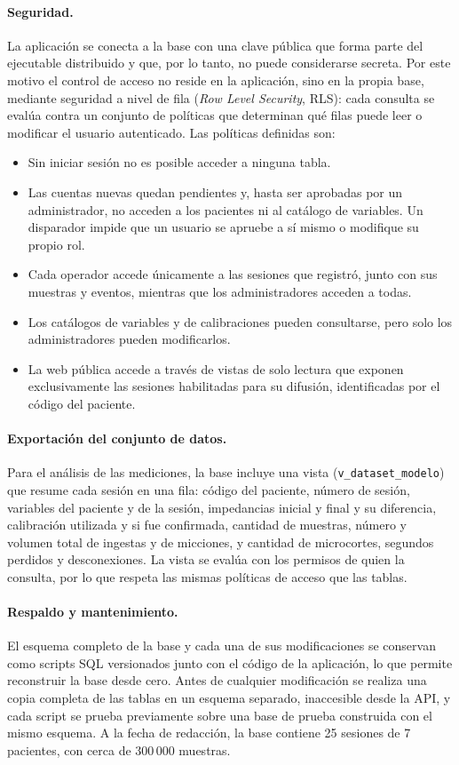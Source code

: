 \paragraph{Seguridad.} La aplicación se conecta a la base con una clave pública que forma parte del ejecutable distribuido y que, por lo tanto, no puede considerarse secreta. Por este motivo el control de acceso no reside en la aplicación, sino en la propia base, mediante seguridad a nivel de fila (\textit{Row Level Security}, RLS): cada consulta se evalúa contra un conjunto de políticas que determinan qué filas puede leer o modificar el usuario autenticado. Las políticas definidas son:
\begin{itemize}
    \item Sin iniciar sesión no es posible acceder a ninguna tabla.
    \item Las cuentas nuevas quedan pendientes y, hasta ser aprobadas por un administrador, no acceden a los pacientes ni al catálogo de variables. Un disparador impide que un usuario se apruebe a sí mismo o modifique su propio rol.
    \item Cada operador accede únicamente a las sesiones que registró, junto con sus muestras y eventos, mientras que los administradores acceden a todas.
    \item Los catálogos de variables y de calibraciones pueden consultarse, pero solo los administradores pueden modificarlos.
    \item La web pública accede a través de vistas de solo lectura que exponen exclusivamente las sesiones habilitadas para su difusión, identificadas por el código del paciente.
\end{itemize}

\paragraph{Exportación del conjunto de datos.} Para el análisis de las mediciones, la base incluye una vista (\texttt{v\_dataset\_modelo}) que resume cada sesión en una fila: código del paciente, número de sesión, variables del paciente y de la sesión, impedancias inicial y final y su diferencia, calibración utilizada y si fue confirmada, cantidad de muestras, número y volumen total de ingestas y de micciones, y cantidad de microcortes, segundos perdidos y desconexiones. La vista se evalúa con los permisos de quien la consulta, por lo que respeta las mismas políticas de acceso que las tablas.

\paragraph{Respaldo y mantenimiento.} El esquema completo de la base y cada una de sus modificaciones se conservan como scripts SQL versionados junto con el código de la aplicación, lo que permite reconstruir la base desde cero. Antes de cualquier modificación se realiza una copia completa de las tablas en un esquema separado, inaccesible desde la API, y cada script se prueba previamente sobre una base de prueba construida con el mismo esquema. A la fecha de redacción, la base contiene 25 sesiones de 7 pacientes, con cerca de 300\,000 muestras.
